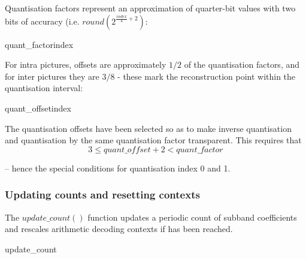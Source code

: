 Quantisation factors represent an approximation of quarter-bit values 
with two bits of accuracy (i.e. $round(2^{\frac{index}{4}+2})$:

\begin{pseudo}{quant\_factor}{index}
\bsEND
\end{pseudo}

For intra pictures, offsets are approximately $1/2$ of the 
quantisation factors, and for inter pictures they are $3/8$ - these
mark the reconstruction point within the quantisation interval:

\begin{pseudo}{quant\_offset}{index}
\bsELSE
    \bsELSE
    \bsEND
  \bsELSE
  \bsEND
\bsEND
{}
\end{pseudo}

\begin{informative}
The quantisation offsets have been selected so as to make inverse quantisation
and quantisation by the same quantisation factor transparent. This requires that
\[3\leq quant\_offset+2<quant\_factor\]

-- hence the special conditions for quantisation index 0 and 1.
\end{informative}

\subsubsection{Updating counts and resetting contexts}
\label{updatecounts}

The $update\_count()$ function updates a periodic count of subband 
coefficients and rescales arithmetic decoding contexts if \CoefficientReset has been reached.

\begin{pseudo}{update\_count}{}
\bsIF{\CoefficientCount == \CoefficientReset}
  \bsEND
\bsEND
\end{pseudo}
